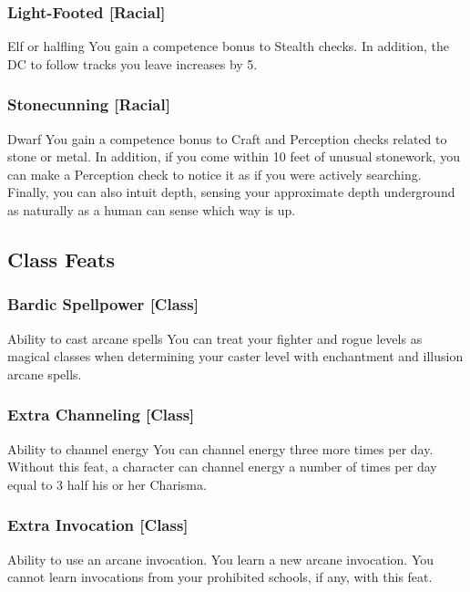 \subsubsection{Light-Footed [Racial]}
 Elf or halfling
 You gain a  competence bonus to Stealth checks. In addition, the DC to follow tracks you leave increases by 5.

\subsubsection{Stonecunning [Racial]}
 Dwarf
 You gain a  competence bonus to Craft and Perception checks related to stone or metal. In addition, if you come within 10 feet of unusual stonework, you can make a Perception check to notice it as if you were actively searching. Finally, you can also intuit depth, sensing your approximate depth underground as naturally as a human can sense which way is up.

\subsection{Class Feats}
\subsubsection{Bardic Spellpower [Class]}
\featpre Ability to cast arcane spells
\featben You can treat your fighter and rogue levels as magical classes when determining your caster level with enchantment and illusion arcane spells.

\subsubsection{Extra Channeling [Class]}
 Ability to channel energy
 You can channel energy three more times per day. 
 Without this feat, a character can channel energy a number of times per day equal to 3 \add half his or her Charisma.

\subsubsection{Extra Invocation [Class]}
 Ability to use an arcane invocation.
 You learn a new arcane invocation. You cannot learn invocations from your prohibited schools, if any, with this feat.

